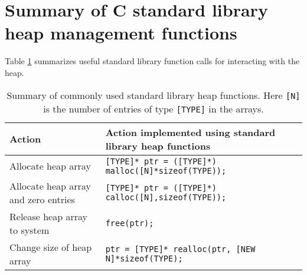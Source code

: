 \section{Summary of C standard library heap management functions}

Table \ref{stdMemoryFunctions.tab} summarizes useful standard library function calls for interacting with the heap.

\begin{table}[htbp!]
    \centering
    \begin{tabular}{l|l} \hline
      Action & Action implemented using standard library heap functions\\ \hline
        Allocate heap array &  \texttt{[TYPE]* ptr = ([TYPE]*) malloc([N]*sizeof(TYPE));} \\
         Allocate heap array and zero entries &  \texttt{[TYPE]* ptr = ([TYPE]*) calloc([N],sizeof(TYPE));} \\
         Release heap array to system & \texttt{free(ptr);}\\
         Change size of heap array & \texttt{ptr = [TYPE]* realloc(ptr, [NEW N]*sizeof(TYPE);}\\
    \hline\end{tabular}
    \caption{Summary of commonly used standard library heap functions. Here \texttt{[N]} is the number of entries of type \texttt{[TYPE]} in the arrays.}    
    \label{stdMemoryFunctions.tab}
\end{table}
